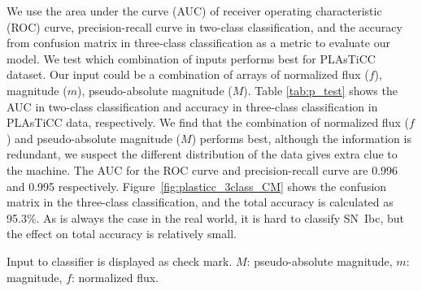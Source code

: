 \documentclass[useamsfonts]{pasj01}
\begin{document}
We use the area under the curve (AUC) of receiver operating characteristic (ROC) curve, precision-recall curve in two-class classification, and the accuracy from confusion matrix in three-class classification as a metric to evaluate our model.
We test which combination of inputs performs best for PLAsTiCC dataset. Our input could be a combination of arrays of normalized flux ($f$), magnitude ($m$), pseudo-absolute magnitude ($M$).
Table \ref{tab:p_test} shows the AUC in two-class classification and accuracy in three-class classification in PLAsTiCC data, respectively.
We find that the combination of normalized flux ($f$) and pseudo-absolute magnitude ($M$) performs best, although the information is redundant, we suspect the different distribution of the data gives extra clue to the machine.
The AUC for the ROC curve and precision-recall curve are 0.996 and 0.995 respectively.
Figure\ \ref{fig:plasticc_3class_CM} shows the confusion matrix in the three-class classification, and the total accuracy is calculated as 95.3\%.
As is always the case in the real world, it is hard to classify SN~Ibc, but the effect on total accuracy is relatively small.
%
\begin{table}[htbp]
\label{tab:p_test}
\begin{tabnote}
\footnotemark[$*$] Input to classifier is displayed as check mark. $M$: pseudo-absolute magnitude, $m$: magnitude, $f$: normalized flux.
\end{tabnote}
\end{table}
\end{document}
